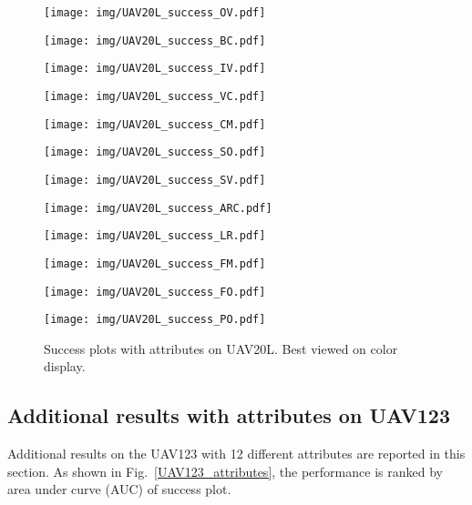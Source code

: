 \documentclass[runningheads]{llncs}
\begin{document}
\begin{figure*}[htbp]
 \centering
\begin{minipage}[c]{3cm}
\texttt{[image: img/UAV20L\_success\_OV.pdf]}
\end{minipage}\begin{minipage}[c]{3cm}
\texttt{[image: img/UAV20L\_success\_BC.pdf]}
\end{minipage}\begin{minipage}[c]{3cm}
\texttt{[image: img/UAV20L\_success\_IV.pdf]}
\end{minipage}\begin{minipage}[c]{3cm}
\texttt{[image: img/UAV20L\_success\_VC.pdf]}
\end{minipage}

\begin{minipage}[c]{3cm}
\texttt{[image: img/UAV20L\_success\_CM.pdf]}
\end{minipage}\begin{minipage}[c]{3cm}
\texttt{[image: img/UAV20L\_success\_SO.pdf]}
\end{minipage}\begin{minipage}[c]{3cm}
\texttt{[image: img/UAV20L\_success\_SV.pdf]}
\end{minipage}\begin{minipage}[c]{3cm}
\texttt{[image: img/UAV20L\_success\_ARC.pdf]}
\end{minipage}

\begin{minipage}[c]{3cm}
\texttt{[image: img/UAV20L\_success\_LR.pdf]}
\end{minipage}\begin{minipage}[c]{3cm}
\texttt{[image: img/UAV20L\_success\_FM.pdf]}
\end{minipage}\begin{minipage}[c]{3cm}
\texttt{[image: img/UAV20L\_success\_FO.pdf]}
\end{minipage}\begin{minipage}[c]{3cm}
\texttt{[image: img/UAV20L\_success\_PO.pdf]}
\end{minipage}\caption{Success plots with attributes on UAV20L. Best viewed on color display.}
\label{UAV20L_attributes}
\end{figure*}

\subsection{Additional results with attributes on UAV123}
Additional results on the UAV123 with 12 different attributes are reported in this section. As shown in Fig.~\ref{UAV123_attributes}, the performance is ranked by area under curve (AUC) of success plot.
\end{document}

